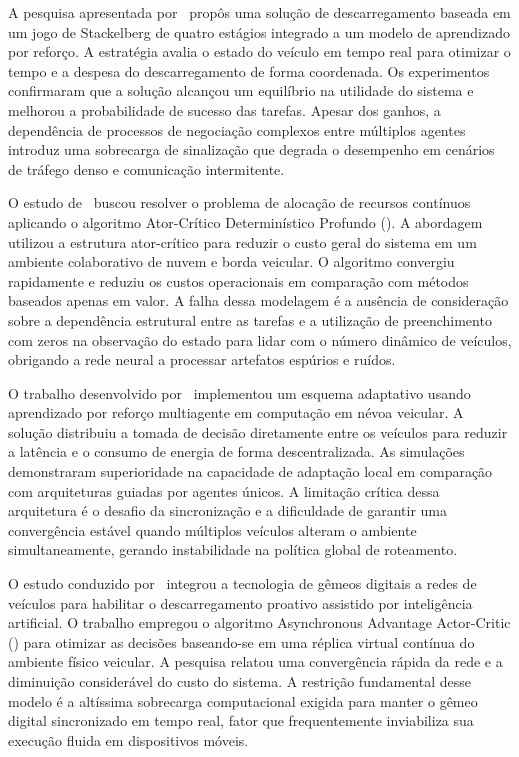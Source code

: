 A pesquisa apresentada por~\cite{fofana2024} propôs uma solução de descarregamento baseada em um jogo de Stackelberg de quatro estágios integrado a um modelo de aprendizado por reforço. A estratégia avalia o estado do veículo em tempo real para otimizar o tempo e a despesa do descarregamento de forma coordenada. Os experimentos confirmaram que a solução alcançou um equilíbrio na utilidade do sistema e melhorou a probabilidade de sucesso das tarefas. Apesar dos ganhos, a dependência de processos de negociação complexos entre múltiplos agentes introduz uma sobrecarga de sinalização que degrada o desempenho em cenários de tráfego denso e comunicação intermitente.

O estudo de~\cite{shi2023} buscou resolver o problema de alocação de recursos contínuos aplicando o algoritmo Ator-Crítico Determinístico Profundo (). A abordagem utilizou a estrutura ator-crítico para reduzir o custo geral do sistema em um ambiente colaborativo de nuvem e borda veicular. O algoritmo convergiu rapidamente e reduziu os custos operacionais em comparação com métodos baseados apenas em valor. A falha dessa modelagem é a ausência de consideração sobre a dependência estrutural entre as tarefas e a utilização de preenchimento com zeros na observação do estado para lidar com o número dinâmico de veículos, obrigando a rede neural a processar artefatos espúrios e ruídos.

O trabalho desenvolvido por~\cite{gao2022} implementou um esquema adaptativo usando aprendizado por reforço multiagente em computação em névoa veicular. A solução distribuiu a tomada de decisão diretamente entre os veículos para reduzir a latência e o consumo de energia de forma descentralizada. As simulações demonstraram superioridade na capacidade de adaptação local em comparação com arquiteturas guiadas por agentes únicos. A limitação crítica dessa arquitetura é o desafio da sincronização e a dificuldade de garantir uma convergência estável quando múltiplos veículos alteram o ambiente simultaneamente, gerando instabilidade na política global de roteamento.

O estudo conduzido por~\cite{zheng2023} integrou a tecnologia de gêmeos digitais a redes de veículos para habilitar o descarregamento proativo assistido por inteligência artificial. O trabalho empregou o algoritmo Asynchronous Advantage Actor-Critic () para otimizar as decisões baseando-se em uma réplica virtual contínua do ambiente físico veicular. A pesquisa relatou uma convergência rápida da rede e a diminuição considerável do custo do sistema. A restrição fundamental desse modelo é a altíssima sobrecarga computacional exigida para manter o gêmeo digital sincronizado em tempo real, fator que frequentemente inviabiliza sua execução fluida em dispositivos móveis.

